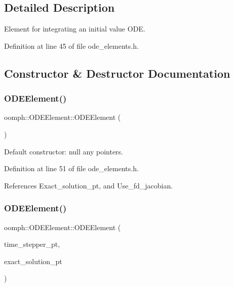 \subsection{Detailed Description}
Element for integrating an initial value O\+DE. 

Definition at line 45 of file ode\+\_\+elements.\+h.



\subsection{Constructor \& Destructor Documentation}
\mbox{\label{classoomph_1_1ODEElement_a727627ab2008a2829f73e6e437be04fa}} 
\subsubsection{\texorpdfstring{O\+D\+E\+Element()}{ODEElement()}\hspace{0.1cm}{\footnotesize\ttfamily [1/2]}}
{\footnotesize\ttfamily oomph\+::\+O\+D\+E\+Element\+::\+O\+D\+E\+Element (\begin{DoxyParamCaption}{ }\end{DoxyParamCaption})\hspace{0.3cm}{\ttfamily [inline]}}



Default constructor\+: null any pointers. 



Definition at line 51 of file ode\+\_\+elements.\+h.



References Exact\+\_\+solution\+\_\+pt, and Use\+\_\+fd\+\_\+jacobian.

\mbox{\label{classoomph_1_1ODEElement_a178efce7a692eb0b245e4a64f44b4576}} 
\subsubsection{\texorpdfstring{O\+D\+E\+Element()}{ODEElement()}\hspace{0.1cm}{\footnotesize\ttfamily [2/2]}}
{\footnotesize\ttfamily oomph\+::\+O\+D\+E\+Element\+::\+O\+D\+E\+Element (\begin{DoxyParamCaption}\item[{\hyperlink{classoomph_1_1TimeStepper}{Time\+Stepper} $\ast$}]{time\+\_\+stepper\+\_\+pt,  }\item[{\hyperlink{classoomph_1_1SolutionFunctorBase}{Solution\+Functor\+Base} $\ast$}]{exact\+\_\+solution\+\_\+pt }\end{DoxyParamCaption})\hspace{0.3cm}{\ttfamily [inline]}}

